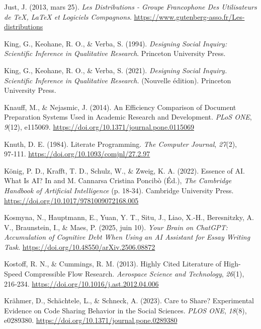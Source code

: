 \documentclass[
  letterpaper,
  DIV=11,
  numbers=noendperiod,
  oneside]{scrreprt}
\newlength{\cslhangindent}
\newlength{\cslentryspacingunit} %
\newenvironment{CSLReferences}[2] %
 {%
  \setlength{\parindent}{0pt}
  \ifodd #1
  \let\oldpar\par
  \def\par{\hangindent=\cslhangindent\oldpar}
  \fi
  \setlength{\parskip}{#2\cslentryspacingunit}
 }%
 {}
\begin{document}
\begin{CSLReferences}{1}{0}
\leavevmode{}%
Just, J. (2013, mars 25). \emph{Les Distributions - {Groupe} Francophone
Des {Utilisateurs} de {TeX}, {LaTeX} et Logiciels Compagnons}.
\url{https://www.gutenberg-asso.fr/Les-distributions}

\leavevmode{}%
King, G., Keohane, R. O., \& Verba, S. (1994). \emph{Designing Social
Inquiry: Scientific Inference in Qualitative Research}. Princeton
University Press.

\leavevmode{}%
King, G., Keohane, R. O., \& Verba, S. (2021). \emph{Designing {Social
Inquiry}. {Scientific Inference} in {Qualitative Research}.} (Nouvelle
édition). Princeton University Press.

\leavevmode{}%
Knauff, M., \& Nejasmic, J. (2014). An {Efficiency Comparison} of
{Document Preparation Systems Used} in {Academic Research} and
{Development}. \emph{PLoS ONE}, \emph{9}(12), e115069.
\url{https://doi.org/10.1371/journal.pone.0115069}

\leavevmode{}%
Knuth, D. E. (1984). Literate {Programming}. \emph{The Computer
Journal}, \emph{27}(2), 97‑111.
\url{https://doi.org/10.1093/comjnl/27.2.97}

\leavevmode{}%
König, P. D., Krafft, T. D., Schulz, W., \& Zweig, K. A. (2022). Essence
of {AI}. {What Is AI}? In and M. Cannarsa Cristina Poncibò (Éd.),
\emph{The {Cambridge Handbook} of {Artificial Intelligence}} (p. 18‑34).
Cambridge University Press.
\url{https://doi.org/10.1017/9781009072168.005}

\leavevmode{}%
Kosmyna, N., Hauptmann, E., Yuan, Y. T., Situ, J., Liao, X.-H.,
Beresnitzky, A. V., Braunstein, I., \& Maes, P. (2025, juin 10).
\emph{Your {Brain} on {ChatGPT}: {Accumulation} of {Cognitive Debt} When
{Using} an {AI Assistant} for {Essay Writing Task}}.
\url{https://doi.org/10.48550/arXiv.2506.08872}

\leavevmode{}%
Kostoff, R. N., \& Cummings, R. M. (2013). Highly Cited Literature of
High-Speed Compressible Flow Research. \emph{Aerospace Science and
Technology}, \emph{26}(1), 216‑234.
\url{https://doi.org/10.1016/j.ast.2012.04.006}

\leavevmode{}%
Krähmer, D., Schächtele, L., \& Schneck, A. (2023). Care to Share?
{Experimental} Evidence on Code Sharing Behavior in the Social Sciences.
\emph{PLOS ONE}, \emph{18}(8), e0289380.
\url{https://doi.org/10.1371/journal.pone.0289380}


\end{CSLReferences}
\end{document}
